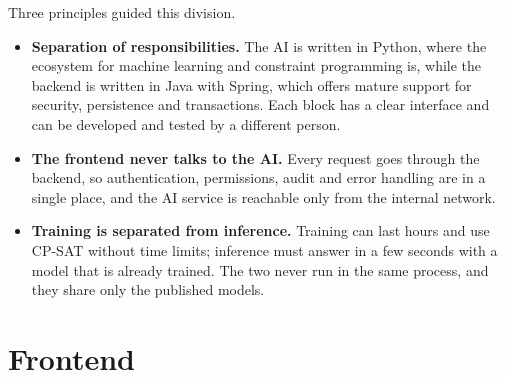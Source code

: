 Three principles guided this division.
\begin{itemize}
  \item \textbf{Separation of responsibilities.} The AI is written in Python, where the
        ecosystem for machine learning and constraint programming is, while the backend is
        written in Java with Spring, which offers mature support for security, persistence and
        transactions. Each block has a clear interface and can be developed and tested by a
        different person.
  \item \textbf{The frontend never talks to the AI.} Every request goes through the backend, so
        authentication, permissions, audit and error handling are in a single place, and the AI
        service is reachable only from the internal network.
  \item \textbf{Training is separated from inference.} Training can last hours and use CP-SAT
        without time limits; inference must answer in a few seconds with a model that is already
        trained. The two never run in the same process, and they share only the published
        models.
\end{itemize}

\section{Frontend}
\label{sec:frontend}

